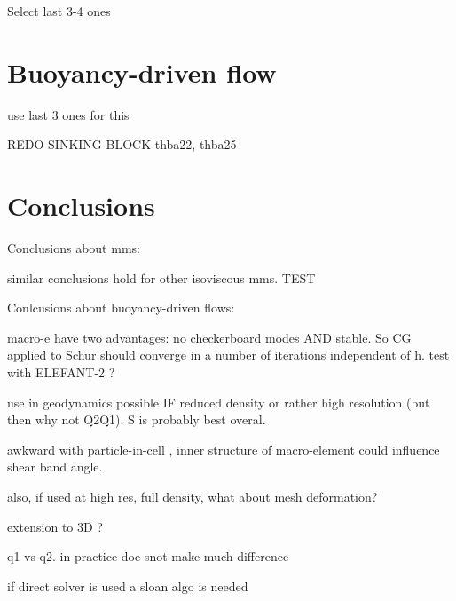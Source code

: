 \documentclass[a4paper]{article}
\begin{document}
Select last 3-4 ones





\section{Buoyancy-driven flow}

use last 3 ones for this

REDO SINKING BLOCK thba22, thba25







\section{Conclusions}\label{sec5}

Conclusions about mms:

similar conclusions hold for other isoviscous mms. TEST




Conlcusions about buoyancy-driven flows:

macro-e have two advantages: no checkerboard modes AND stable. So CG applied to Schur should converge in a number of iterations independent of h. test with ELEFANT-2 ?

use in geodynamics possible IF reduced density or rather high resolution (but then why not Q2Q1). S is probably best overal.

awkward with particle-in-cell , inner structure of macro-element could influence shear band angle. 

also, if used at high res, full density, what about mesh deformation?

extension to 3D ?

q1 vs q2. in practice doe snot make much difference

if direct solver is used a sloan algo is needed



\printbibliography
\end{document}
